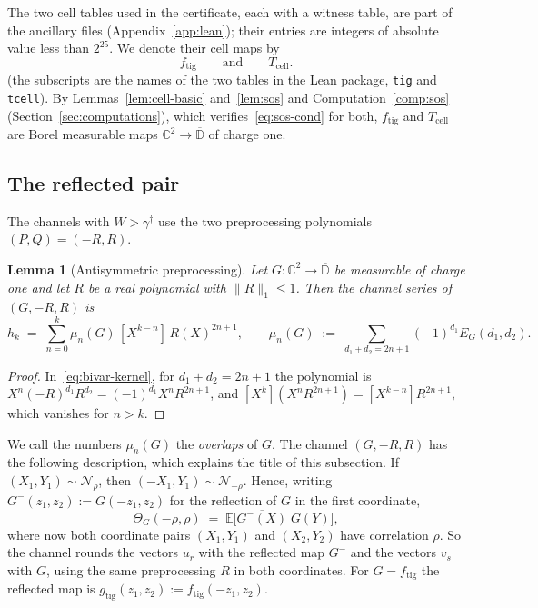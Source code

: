 \documentclass[11pt,reqno]{amsart}
\newtheorem{lemma}[theorem]{Lemma}
\theoremstyle{definition}
\numberwithin{equation}{section}
\newcommand{\C}{\mathbb{C}}
\newcommand{\D}{\mathbb{D}}
\newcommand{\E}{\mathbb{E}}
\newcommand{\gd}{\gamma^\dagger}
\newcommand{\lone}[1]{\|#1\|_1}
\newcommand{\Tcell}{T_{\mathrm{cell}}}
\newcommand{\ftig}{f_{\mathrm{tig}}}
\newcommand{\gtig}{g_{\mathrm{tig}}}
\begin{document}
The two cell tables used in the certificate, each with a witness table, are part of the ancillary files (Appendix~\ref{app:lean}); their entries are integers of absolute value less than $2^{25}$. We denote their cell maps by
\[
  \ftig \qquad\text{and}\qquad \Tcell .
\]
(the subscripts are the names of the two tables in the Lean package, \texttt{tig} and \texttt{tcell}). By Lemmas~\ref{lem:cell-basic} and~\ref{lem:sos} and Computation~\ref{comp:sos} (Section~\ref{sec:computations}), which verifies~\eqref{eq:sos-cond} for both, $\ftig$ and $\Tcell$ are Borel measurable maps $\C^2\to\overline{\D}$ of charge one.

\subsection{The reflected pair}\label{sec:tiger}
The channels with $W>\gd$ use the two preprocessing polynomials $(P,Q)=(-R,R)$.

\begin{lemma}[Antisymmetric preprocessing]\label{lem:anti}
Let $G:\C^2\to\overline{\D}$ be measurable of charge one and let $R$ be a real polynomial with $\lone{R}\le1$. Then the channel series of $(G,-R,R)$ is
\begin{equation}\label{eq:anti-series}
  h_k \;=\; \sum_{n=0}^k \mu_n(G)\, [X^{k-n}]\, R(X)^{2n+1},
  \qquad
  \mu_n(G) \;:=\; \sum_{d_1 + d_2 = 2n + 1} (-1)^{d_1} E_{G}(d_1, d_2).
\end{equation}
\end{lemma}

\begin{proof}
In~\eqref{eq:bivar-kernel}, for $d_1+d_2=2n+1$ the polynomial is $X^{n}(-R)^{d_1}R^{d_2}=(-1)^{d_1}X^nR^{2n+1}$, and $[X^k](X^nR^{2n+1})=[X^{k-n}]R^{2n+1}$, which vanishes for $n>k$.
\end{proof}

We call the numbers $\mu_n(G)$ the \emph{overlaps} of $G$. The channel $(G,-R,R)$ has the following description, which explains the title of this subsection. If $(X_1,Y_1)\sim\mathcal{N}_\rho$, then $(-X_1,Y_1)\sim\mathcal{N}_{-\rho}$. Hence, writing $G^-(z_1,z_2):=G(-z_1,z_2)$ for the reflection of $G$ in the first coordinate,
\[
  \Theta_G(-\rho,\rho) \;=\; \E\bigl[\overline{G^-(X)}\;G(Y)\bigr],
\]
where now both coordinate pairs $(X_1,Y_1)$ and $(X_2,Y_2)$ have correlation $\rho$. So the channel rounds the vectors $u_r$ with the reflected map $G^-$ and the vectors $v_s$ with $G$, using the same preprocessing $R$ in both coordinates. For $G=\ftig$ the reflected map is $\gtig(z_1,z_2):=\ftig(-z_1,z_2)$.
\end{document}
